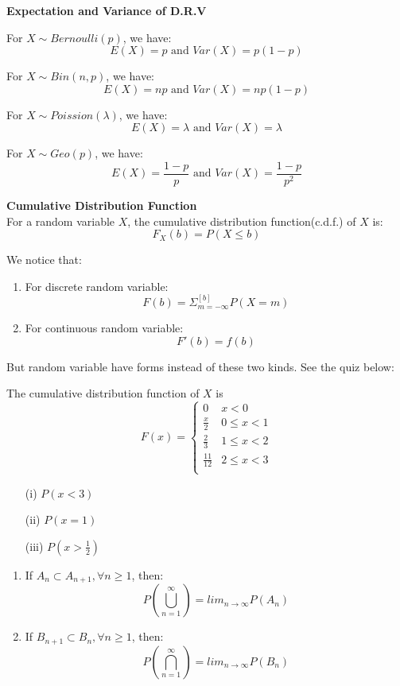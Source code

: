 \documentclass{article}
\begin{document}
\begin{theorem}
    \textbf{Expectation and Variance of D.R.V}
    \item For $X \sim Bernoulli(p)$, we have:
    $$ E(X) = p \text{ and } Var(X) = p(1-p)$$
    \item For $X \sim Bin(n, p)$, we have:
    $$ E(X) = np \text{ and } Var(X) = np(1-p)$$
    \item For $X \sim Poission(\lambda)$, we have:
    $$ E(X) = \lambda \text{ and } Var(X) = \lambda$$
    \item For $X \sim Geo(p)$, we have:
    $$ E(X) = \frac{1-p}{p} \text{ and } Var(X) =\frac{1-p}{p^2}$$
\end{theorem}

\begin{definition}
    \textbf{Cumulative Distribution Function}\\
    For a random variable $X$, the cumulative distribution function(c.d.f.) of $X$ is:
    $$ F_X(b) = P(X \leq b)$$
\end{definition}
We notice that:
\begin{enumerate}
    \item For discrete random variable:
    $$ F(b) = \Sigma^{[b]}_{m = -\infty}P(X = m) $$
    \item For continuous random variable:
    $$ F'(b) = f(b)$$
\end{enumerate}
But random variable have forms instead of these two kinds. See the quiz below:
\begin{quiz}
    The cumulative distribution function of $X$ is
    \[
    F(x) = 
    \begin{cases}
        0 & x < 0 \\
        \frac{x}{2} & 0 \leq x < 1 \\
        \frac{2}{3} & 1 \leq x < 2 \\
        \frac{11}{12} & 2 \leq x < 3\\
    \end{cases}
    \]
    \begin{enumerate}
        \item[(i)] $P(x < 3)$
        \item[(ii)] $P(x = 1)$
        \item[(iii)] $P(x > \frac{1}{2})$
    \end{enumerate}
\end{quiz}

\begin{theorem}
    \begin{enumerate}
        \item If $A_n \subset A_{n+1}, \forall n \geq 1$, then:
    $$P(\bigcup^{\infty}_{n=1}) = lim_{n \rightarrow \infty}P(A_n)$$
        \item If $B_{n+1} \subset B_{n}, \forall n \geq 1$, then:
    $$P(\bigcap^{\infty}_{n=1}) = lim_{n \rightarrow \infty}P(B_n)$$
    \end{enumerate}
\end{theorem}
\end{document}
